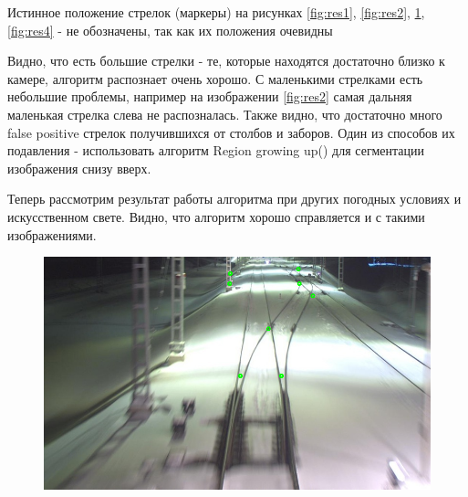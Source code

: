 Истинное положение стрелок (маркеры) на рисунках \ref{fig:res1}, \ref{fig:res2}, \ref{fig:res3}, \ref{fig:res4} - не обозначены, так как их положения очевидны

Видно, что есть большие стрелки - те, которые находятся достаточно близко к камере, алгоритм распознает очень хорошо. С маленькими стрелками есть небольшие проблемы, например на изображении \ref{fig:res2} самая дальняя маленькая стрелка слева не распозналась.\newline
Также видно, что достаточно много false positive стрелок получившихся от столбов и заборов. Один из способов их подавления - использовать алгоритм Region growing up(\cite{b:growing_up}) для сегментации изображения снизу вверх.

Теперь рассмотрим результат работы алгоритма при других погодных условиях и искусственном свете. Видно, что алгоритм хорошо справляется и с такими изображениями.
\begin{figure}[!h]
	\centering
	\includegraphics[width=0.7\linewidth]{pictures/screenshot0017}
	\caption{}
	\label{fig:res3}
\end{figure}

